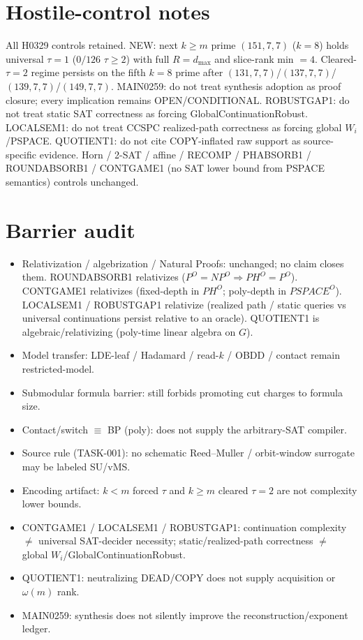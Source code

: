 \documentclass[11pt]{article}
\begin{document}
\section*{Hostile-control notes}
All H0329 controls retained. NEW: next $k{\ge}m$ prime $(151,7,7)$ ($k{=}8$) holds universal
$\tau{=}1$ ($0/126$ $\tau{\ge}2$) with full $R{=}d_{\max}$ and slice-rank min $=4$.
Cleared-$\tau{=}2$ regime persists on the fifth $k{=}8$ prime after $(131,7,7)$/$(137,7,7)$/$(139,7,7)$/$(149,7,7)$.
MAIN0259: do not treat synthesis adoption as proof closure; every implication remains OPEN/CONDITIONAL.
ROBUSTGAP1: do not treat static SAT correctness as forcing GlobalContinuationRobust.
LOCALSEM1: do not treat CCSPC realized-path correctness as forcing global $W_i$/PSPACE.
QUOTIENT1: do not cite COPY-inflated raw support as source-specific evidence. Horn / 2-SAT / affine /
RECOMP / PHABSORB1 / ROUNDABSORB1 / CONTGAME1 (no SAT lower bound from PSPACE semantics)
controls unchanged.

\section*{Barrier audit}
\begin{itemize}
\item Relativization / algebrization / Natural Proofs: unchanged; no claim closes them.
  ROUNDABSORB1 relativizes ($P^O{=}NP^O\Rightarrow PH^O{=}P^O$).
  CONTGAME1 relativizes (fixed-depth in $PH^O$; poly-depth in $PSPACE^O$).
  LOCALSEM1 / ROBUSTGAP1 relativize (realized path / static queries vs universal continuations
  persist relative to an oracle).
  QUOTIENT1 is algebraic/relativizing (poly-time linear algebra on $G$).
\item Model transfer: LDE-leaf / Hadamard / read-$k$ / OBDD / contact remain restricted-model.
\item Submodular formula barrier: still forbids promoting cut charges to formula size.
\item Contact/switch $\equiv$ BP (poly): does not supply the arbitrary-SAT compiler.
\item Source rule (TASK-001): no schematic Reed--Muller / orbit-window surrogate may be labeled SU/vMS.
\item Encoding artifact: $k{<}m$ forced $\tau$ and $k{\ge}m$ cleared $\tau{=}2$ are not complexity lower bounds.
\item CONTGAME1 / LOCALSEM1 / ROBUSTGAP1: continuation complexity $\neq$ universal SAT-decider necessity;
  static/realized-path correctness $\neq$ global $W_i$/GlobalContinuationRobust.
\item QUOTIENT1: neutralizing DEAD/COPY does not supply acquisition or $\omega(m)$ rank.
\item MAIN0259: synthesis does not silently improve the reconstruction/exponent ledger.
\end{itemize}
\end{document}
